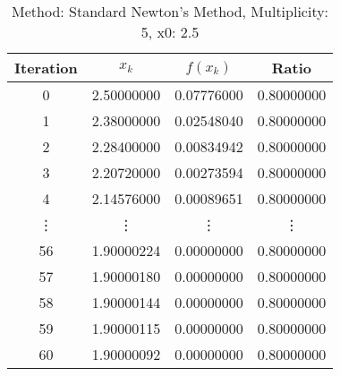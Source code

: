 \begin{table}
\centering
\caption{Method: Standard Newton's Method, Multiplicity: 5, x0: 2.5}
\label{tab:table_Standard_Newton's_Method_5_2_5}
\begin{tabular}{c c c c}
\toprule
Iteration &      $x_k$ &   $f(x_k)$ &      Ratio \\
\midrule
        0 & 2.50000000 & 0.07776000 & 0.80000000 \\
        1 & 2.38000000 & 0.02548040 & 0.80000000 \\
        2 & 2.28400000 & 0.00834942 & 0.80000000 \\
        3 & 2.20720000 & 0.00273594 & 0.80000000 \\
        4 & 2.14576000 & 0.00089651 & 0.80000000 \\
   \vdots &     \vdots &     \vdots &     \vdots \\
       56 & 1.90000224 & 0.00000000 & 0.80000000 \\
       57 & 1.90000180 & 0.00000000 & 0.80000000 \\
       58 & 1.90000144 & 0.00000000 & 0.80000000 \\
       59 & 1.90000115 & 0.00000000 & 0.80000000 \\
       60 & 1.90000092 & 0.00000000 & 0.80000000 \\
\bottomrule
\end{tabular}
\end{table}
